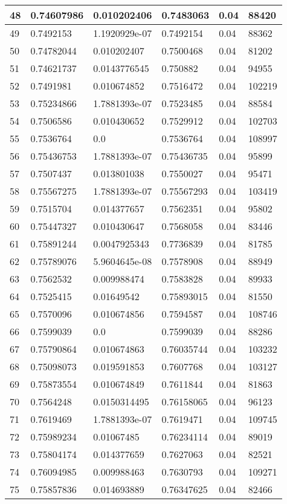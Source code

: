 \begin{longtable}{|l|l|l|l|l|l|}
48 & 0.74607986 & 0.010202406 & 0.7483063 & 0.04 & 88420 \\ \hline 
49 & 0.7492153 & 1.1920929e-07 & 0.7492154 & 0.04 & 88362 \\ \hline 
50 & 0.74782044 & 0.010202407 & 0.7500468 & 0.04 & 81202 \\ \hline 
51 & 0.74621737 & 0.0143776545 & 0.750882 & 0.04 & 94955 \\ \hline 
52 & 0.7491981 & 0.010674852 & 0.7516472 & 0.04 & 102219 \\ \hline 
53 & 0.75234866 & 1.7881393e-07 & 0.7523485 & 0.04 & 88584 \\ \hline 
54 & 0.7506586 & 0.010430652 & 0.7529912 & 0.04 & 102703 \\ \hline 
55 & 0.7536764 & 0.0 & 0.7536764 & 0.04 & 108997 \\ \hline 
56 & 0.75436753 & 1.7881393e-07 & 0.75436735 & 0.04 & 95899 \\ \hline 
57 & 0.7507437 & 0.013801038 & 0.7550027 & 0.04 & 95471 \\ \hline 
58 & 0.75567275 & 1.7881393e-07 & 0.75567293 & 0.04 & 103419 \\ \hline 
59 & 0.7515704 & 0.014377657 & 0.7562351 & 0.04 & 95802 \\ \hline 
60 & 0.75447327 & 0.010430647 & 0.7568058 & 0.04 & 83446 \\ \hline 
61 & 0.75891244 & 0.0047925343 & 0.7736839 & 0.04 & 81785 \\ \hline 
62 & 0.75789076 & 5.9604645e-08 & 0.7578908 & 0.04 & 88949 \\ \hline 
63 & 0.7562532 & 0.009988474 & 0.7583828 & 0.04 & 89933 \\ \hline 
64 & 0.7525415 & 0.01649542 & 0.75893015 & 0.04 & 81550 \\ \hline 
65 & 0.7570096 & 0.010674856 & 0.7594587 & 0.04 & 108746 \\ \hline 
66 & 0.7599039 & 0.0 & 0.7599039 & 0.04 & 88286 \\ \hline 
67 & 0.75790864 & 0.010674863 & 0.76035744 & 0.04 & 103232 \\ \hline 
68 & 0.75098073 & 0.019591853 & 0.7607768 & 0.04 & 103127 \\ \hline 
69 & 0.75873554 & 0.010674849 & 0.7611844 & 0.04 & 81863 \\ \hline 
70 & 0.7564248 & 0.0150314495 & 0.76158065 & 0.04 & 96123 \\ \hline 
71 & 0.7619469 & 1.7881393e-07 & 0.7619471 & 0.04 & 109745 \\ \hline 
72 & 0.75989234 & 0.01067485 & 0.76234114 & 0.04 & 89019 \\ \hline 
73 & 0.75804174 & 0.014377659 & 0.7627063 & 0.04 & 82521 \\ \hline 
74 & 0.76094985 & 0.009988463 & 0.7630793 & 0.04 & 109271 \\ \hline 
75 & 0.75857836 & 0.014693889 & 0.76347625 & 0.04 & 82466 \\ \hline 
\end{longtable}